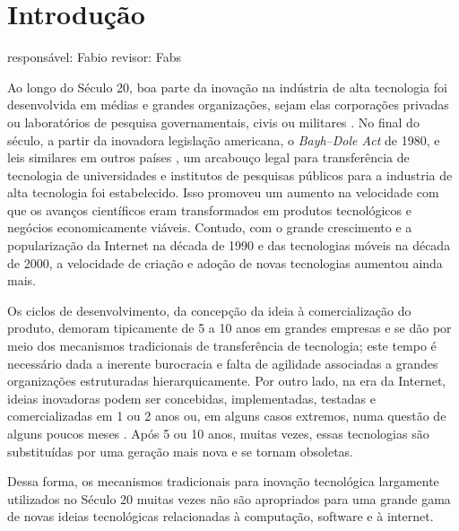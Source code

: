 \section{Introdução}

responsável: Fabio revisor: Fabs

Ao longo do Século 20, boa parte da inovação na indústria de alta tecnologia foi desenvolvida em médias e grandes organizações, sejam elas corporações privadas ou laboratórios de pesquisa governamentais, civis ou militares \cite{Chesbrough2008}. No final do século, a partir da inovadora legislação americana, o \emph{Bayh–Dole Act} de 1980, e leis similares em outros países \cite{Mowery2004}, um arcabouço legal para transferência de tecnologia de universidades e institutos de pesquisas públicos para a industria de alta tecnologia foi estabelecido. Isso promoveu um aumento na velocidade com que os avanços científicos eram transformados em produtos tecnológicos e negócios economicamente viáveis. Contudo, com o grande crescimento e a popularização da Internet na década de 1990 e das tecnologias móveis na década de 2000, a velocidade de criação e adoção de novas tecnologias aumentou ainda mais. 

Os ciclos de desenvolvimento, da concepção da ideia à comercialização do produto, demoram tipicamente de 5 a 10 anos em grandes empresas \cite{ries:2011} e se dão por meio dos mecanismos tradicionais de transferência de tecnologia; este tempo é necessário dada a inerente burocracia e falta de agilidade associadas a grandes organizações estruturadas hierarquicamente.
Por outro lado, na era da Internet, ideias inovadoras podem ser concebidas, implementadas, testadas e comercializadas em 1 ou 2 anos ou, em alguns casos extremos, numa questão de alguns poucos meses \cite{benkler:2006,goldman:2005}. Após 5 ou 10 anos, muitas vezes, essas tecnologias são substituídas por uma geração mais nova e se tornam obsoletas.

Dessa forma, os mecanismos tradicionais para inovação tecnológica largamente utilizados no Século 20 muitas vezes não são apropriados para uma grande gama de novas ideias tecnológicas relacionadas à computação, software e à internet.

